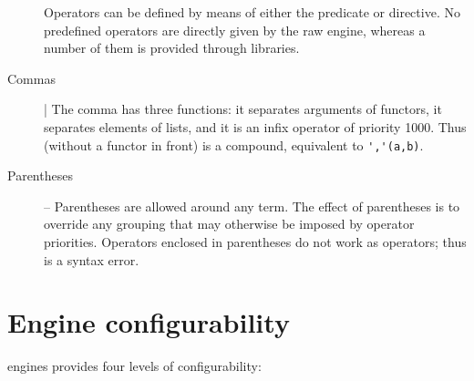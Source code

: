 \begin{description}
Operators can be defined by means of either the  predicate or directive.
%
No predefined operators are directly given by the raw \tuprolog{} engine, whereas a number of them is provided through libraries.

\item[Commas] |
The comma has three functions: it separates arguments of functors, it separates elements of lists, and it is an infix operator of priority 1000.
%
Thus  (without a functor in front) is a compound, equivalent to \verb|','(a,b)|.

\item[Parentheses] -- Parentheses are allowed around any term.
%
The effect of parentheses is to override any grouping that may
otherwise be imposed by operator priorities.
%
Operators enclosed in parentheses do not work as operators;
thus  is a syntax error.
\end{description}

\section{Engine configurability}
\label{sec:engine-configurability}
\tuprolog{} engines provides four levels of configurability:

